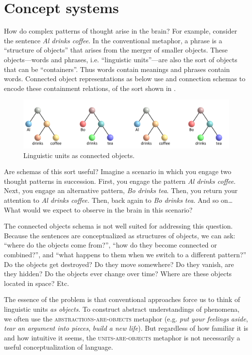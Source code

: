 \section{Concept systems}

How do complex patterns of thought arise in the brain? For example, consider the sentence \textit{Al drinks coffee}. In the conventional metaphor, a phrase is a “structure of objects” that arises from the merger of smaller objects. These objects—words and phrases, i.e. “linguistic units”—are also the sort of objects that can be “containers”. Thus words contain meanings and phrases contain words. Connected object representations as below use  and connection schemas to encode these containment relations, of the sort shown in {}.

  
\begin{figure}
\includegraphics[width=\textwidth]{figures/Tilsen-img8.png}
\caption{Linguistic units as connected objects.}
\label{fig:2:1}
\end{figure}
 

  Are schemas of this sort useful? Imagine a scenario in which you engage two thought patterns in succession. First, you engage the pattern \textit{Al drinks coffee}. Next, you engage an alternative pattern, \textit{Bo drinks tea}. Then, you return your attention to \textit{Al drinks coffee.} Then, back again to \textit{Bo drinks tea}. And so on… What would we expect to observe in the brain in this scenario? 

  The connected objects schema is not well suited for addressing this question. Because the sentences are conceptualized as structures of objects, we can ask: “where do the objects come from?”, “how do they become connected or combined?”, and “what happens to them when we switch to a different pattern?” Do the objects get destroyed? Do they move somewhere? Do they vanish, are they hidden? Do the objects ever change over time? Where are these objects located in space? Etc.

  The essence of the problem is that conventional approaches force us to think of linguistic units \textit{as objects}. To construct abstract understandings of phenomena, we often use the \textsc{abstractions-}\textsc{are}\textsc{{}-objects} metaphor (e.g. \textit{put your feelings aside}, \textit{tear an argument into pieces}, \textit{build a new life}). But regardless of how familiar it is and how intuitive it seems, the \textsc{units}\textsc{{}-are-}\textsc{objects} metaphor is not necessarily a useful conceptualization of language. 

